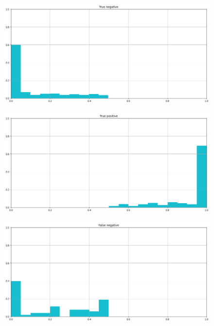 \documentclass[12pt]{report}
\theoremstyle{definition}
\begin{document}
\begin{figure}
\centering
    \begin{minipage}{0.48\textwidth}
     \includegraphics[width=\linewidth]{images/experiment_kaggle/tn.png}\label{tn_k}
   \end{minipage}
   \begin{minipage}{0.48\textwidth}
     \includegraphics[width=\linewidth]{images/experiment_kaggle/tp.png}\label{tp_k}
   \end{minipage}
   \begin{minipage}{0.48\textwidth}
     \includegraphics[width=\linewidth]{images/experiment_kaggle/fn.png}\label{fn_k}
   \end{minipage}

\end{figure}
\end{document}
